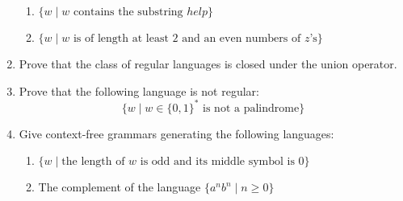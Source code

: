 \documentclass[11pt]{article}
\begin{document}
\begin{enumerate}
\begin{enumerate}
		\item $\{w \mid w \mbox{ contains the substring $help$}\}$
		\item $\{w \mid w \mbox{ is of length at least 2 and an even numbers of $z$'s}\}$
	    \end{enumerate}
   	\item  Prove that the class of regular languages is closed under the union operator.
   	\item Prove that the following language is not regular:
		$$
			\{ w \mid w \in \{0,1\}^* \mbox{ is not a palindrome}\}
		$$
   	\item Give context-free grammars generating the following languages:
	  \begin{enumerate}
		\item $\{w \mid \mbox{the length of $w$ is odd and its middle symbol is $0$}\}$
		\item The complement of the language $\{a^n b^n \mid n\geq 0\}$
	  \end{enumerate}
\end{enumerate}



 
\end{document}
